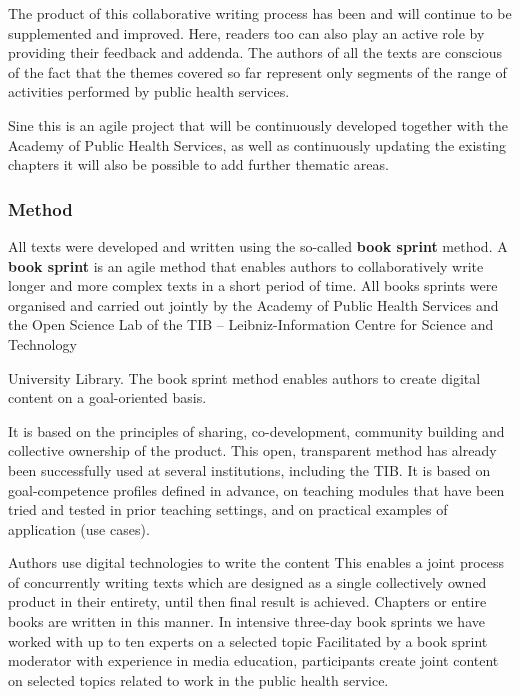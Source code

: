 \documentclass{article}
\begin{document}
The product of this collaborative writing process has been and will continue to be supplemented and improved. Here, readers too can also play an active role by providing their feedback and addenda. The authors of all the texts are conscious of the fact that the themes covered so far represent only segments of the range of activities performed by public health services.


Sine this is an agile project that will be continuously developed together with the Academy of Public Health Services, as well as continuously updating the existing chapters it will also be possible to add further thematic areas.


\subsubsection{Method}\label{H99013}



All texts were developed and written using the so-called \textbf{book sprint} method. A \textbf{book sprint} is an agile method that enables authors to collaboratively write longer and more complex texts in a short period of time. All books sprints were organised and carried out jointly by the Academy of Public Health Services and the Open Science Lab of the TIB – Leibniz-Information Centre for Science and Technology


University Library. The book sprint method enables authors to create digital content on a goal-oriented basis.


It is based on the principles of sharing, co-development, community building and collective ownership of the product. This open, transparent method has already been successfully used at several institutions, including the TIB. It is based on goal-competence profiles defined in advance, on teaching modules that have been tried and tested in prior teaching settings, and on practical examples of application (use cases).


Authors use digital technologies to write the content This enables a joint process of concurrently writing texts which are designed as a single collectively owned product in their entirety, until then final result is achieved. Chapters or entire books are written in this manner. In intensive three-day book sprints we have worked with up to ten experts on a selected topic Facilitated by a book sprint moderator with experience in media education, participants create joint content on selected topics related to work in the public health service.
\end{document}
